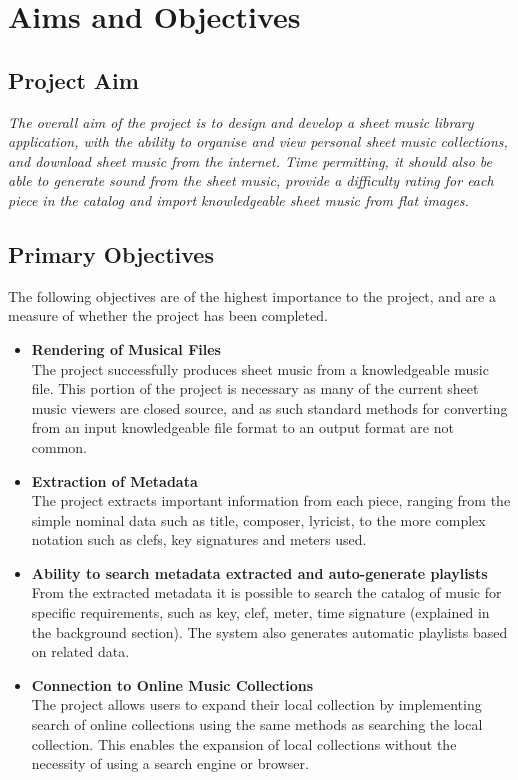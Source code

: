 \section{Aims and Objectives}
\subsection{Project Aim}
\begin{center}
\textit{The overall aim of the project is to design and develop a sheet music library application, with the ability to organise and view personal sheet music collections, and download sheet music from the internet. Time permitting, it should also be able to generate sound from the sheet music, provide a difficulty rating for each piece in the catalog and import knowledgeable sheet music from flat images.}
\end{center}
\subsection{Primary Objectives}
The following objectives are of the highest importance to the project, and are a measure of whether the project has been completed.
\begin{itemize}
    \item \textbf{Rendering of Musical Files}\\
    The project successfully produces sheet music from a knowledgeable music file. This portion of the project is necessary as many of the current sheet music viewers are closed source, and as such standard methods for converting from an input knowledgeable file format to an output format are not common.
    \item \textbf{Extraction of Metadata}\\
    The project extracts important information from each piece, ranging from the simple nominal data such as title, composer, lyricist, to the more complex notation such as clefs, key signatures and meters used. 
    \item \textbf{Ability to search metadata extracted and auto-generate playlists}\\ From the extracted metadata it is possible to search the catalog of music for specific requirements, such as key, clef, meter, time signature (explained in the background section). The system also generates automatic playlists based on related data.
    \item \textbf{Connection to Online Music Collections}\\
    The project allows users to expand their local collection by implementing search of online collections using the same methods as searching the local collection. This enables the expansion of local collections without the necessity of using a search engine or browser.

\end{itemize}
